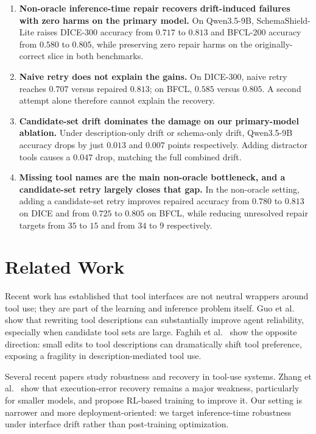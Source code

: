 \documentclass[runningheads]{llncs}
\newcommand{\method}{SchemaShield-Lite\xspace}
\begin{document}
\begin{enumerate}
\item \textbf{Non-oracle inference-time repair recovers drift-induced failures
with zero harms on the primary model.} On Qwen3.5-9B, \method raises DICE-300
accuracy from $0.717$ to $0.813$ and BFCL-200 accuracy from $0.580$ to $0.805$,
while preserving zero repair harms on the originally-correct slice in both
benchmarks.

\item \textbf{Naive retry does not explain the gains.} On DICE-300, naive retry
reaches $0.707$ versus repaired $0.813$; on BFCL, $0.585$ versus $0.805$. A second
attempt alone therefore cannot explain the recovery.

\item \textbf{Candidate-set drift dominates the damage on our primary-model ablation.}
Under description-only drift or schema-only drift, Qwen3.5-9B accuracy drops by just
$0.013$ and $0.007$ points respectively. Adding distractor tools causes a $0.047$
drop, matching the full combined drift.

\item \textbf{Missing tool names are the main non-oracle bottleneck, and a
candidate-set retry largely closes that gap.} In the non-oracle setting, adding a
candidate-set retry improves repaired accuracy from $0.780$ to $0.813$ on DICE and
from $0.725$ to $0.805$ on BFCL, while reducing unresolved repair targets from $35$
to $15$ and from $34$ to $9$ respectively.
\end{enumerate}

\section{Related Work}
Recent work has established that tool interfaces are not neutral wrappers around
tool use; they are part of the learning and inference problem itself.
Guo et al.~\cite{guo2026rewrite} show that rewriting tool descriptions can
substantially improve agent reliability, especially when candidate tool sets are
large. Faghih et al.~\cite{faghih2025gaming} show the opposite direction:
small edits to tool descriptions can dramatically shift tool preference, exposing a
fragility in description-mediated tool use.

Several recent papers study robustness and recovery in tool-use systems.
Zhang et al.~\cite{zhang2026fission} show that execution-error recovery remains a
major weakness, particularly for smaller models, and propose RL-based training to
improve it. Our setting is narrower and more deployment-oriented: we target
inference-time robustness under interface drift rather than post-training
optimization.
\end{document}
